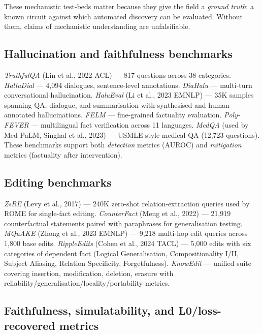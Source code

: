 \documentclass{article}
\begin{document}
These mechanistic test-beds matter because they give the field a \emph{ground truth}: a known circuit against which automated discovery can be evaluated. Without them, claims of mechanistic understanding are unfalsifiable.

\subsection{Hallucination and faithfulness benchmarks}\label{hallucination-and-faithfulness-benchmarks}

\emph{TruthfulQA} (Lin et al., 2022 ACL) --- 817 questions across 38 categories. \emph{HalluDial} \citep{luo2024localinterpretatio} --- 4,094 dialogues, sentence-level annotations. \emph{DiaHalu} \citep{chen2024diahaluadialoguele} --- multi-turn conversational hallucination. \emph{HaluEval} (Li et al., 2023 EMNLP) --- 35K samples spanning QA, dialogue, and summarisation with synthesised and human-annotated hallucinations. \emph{FELM} \citep{chen2024diahaluadialoguele} --- fine-grained factuality evaluation. \emph{Poly-FEVER} \citep{zhang2025jailbreakdistillat} --- multilingual fact verification across 11 languages. \emph{MedQA} (used by Med-PaLM, Singhal et al., 2023) --- USMLE-style medical QA (12,723 questions). These benchmarks support both \emph{detection} metrics (AUROC) and \emph{mitigation} metrics (factuality after intervention).

\subsection{Editing benchmarks}\label{editing-benchmarks}

\emph{ZsRE} (Levy et al., 2017) --- 240K zero-shot relation-extraction queries used by ROME for single-fact editing. \emph{CounterFact} (Meng et al., 2022) --- 21,919 counterfactual statements paired with paraphrases for generalisation testing. \emph{MQuAKE} (Zhong et al., 2023 EMNLP) --- 9,218 multi-hop edit queries across 1,800 base edits. \emph{RippleEdits} (Cohen et al., 2024 TACL) --- 5,000 edits with six categories of dependent fact (Logical Generalisation, Compositionality I/II, Subject Aliasing, Relation Specificity, Forgetfulness). \emph{KnowEdit} \citep{zhang2024acomprehensivestud} --- unified suite covering insertion, modification, deletion, erasure with reliability/generalisation/locality/portability metrics.

\subsection{Faithfulness, simulatability, and L0/loss-recovered metrics}\label{faithfulness-simulatability-and-l0loss-recovered-metrics}
\end{document}
